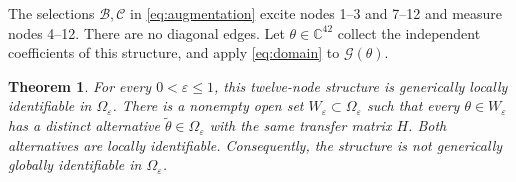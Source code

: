 \documentclass[letterpaper,10pt,conference]{ieeeconf}
\newtheorem{theorem}{Theorem}
\begin{document}
The selections \(\mathcal B,\mathcal C\) in \eqref{eq:augmentation}
excite nodes 1--3 and 7--12 and measure nodes 4--12.
There are no diagonal edges.
Let \(\theta\in\mathbb C^{42}\) collect the independent coefficients
of this structure, and apply \eqref{eq:domain} to \(\mathcal G(\theta)\).

\begin{theorem}\label{thm:main}
For every \(0<\varepsilon\le1\), this twelve-node structure is
generically locally identifiable in \(\Omega_\varepsilon\).
There is a nonempty open set \(W_\varepsilon\subset\Omega_\varepsilon\)
such that every \(\theta\in W_\varepsilon\) has a distinct alternative
\(\widetilde\theta\in\Omega_\varepsilon\) with the same transfer matrix \(H\).
Both alternatives are locally identifiable. Consequently, the structure
is not generically globally identifiable in \(\Omega_\varepsilon\).
\end{theorem}
\end{document}
